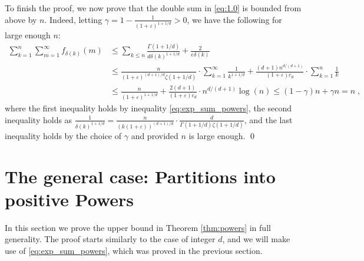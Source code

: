 \documentclass[11pt]{article}
\theoremstyle{plain}
\begin{document}
To finish the proof, we now prove that the double sum in \eqref{eq:1.0} is bounded from above by $n$. Indeed, letting $\gamma=1-\frac{1}{(1+\varepsilon)^{1+1/d}}>0$, we have the following for large enough $n$:
\begin{align*}
    \sum _{k=1}^{n} \sum_{m=1}^{\infty} f_{\delta(k)}(m) &\leq \sum _{k\leq n} \frac{\Gamma\left(1+{1}/{d}\right)}{d\delta(k)^{1+1/d}}+\frac{2}{e\delta(k)}\\
    &\leq \frac{n}{(1+\varepsilon)^{(d+1)/d}{\zeta\left(1+{1}/{d}\right)}}\cdot \sum_{k=1}^{\infty}\frac{1}{k^{1+1/d}}+\frac{(d+1)n^{d/(d+1)}}{(1+\varepsilon)c_d}\cdot \sum_{k=1}^{n}\frac{1}{k}\\
     &\leq \frac{n}{(1+\varepsilon)^{1+1/d}} +\frac{2(d+1)}{(1+\varepsilon) c_d}\cdot n^{d/(d+1)}\log(n)\leq (1-\gamma)n+\gamma n=n\;,
\end{align*}
where the first inequality holds by inequality \eqref{eq:exp_sum_powers}, the second inequality holds as $\frac{1}{\delta(k)^{1+1/d}}=\frac{n}{(k(1+\varepsilon))^{(d+1)/d}}\cdot \frac{d}{\Gamma\left(1+{1}/{d}\right)\zeta\left(1+{1}/{d}\right)}$, and the last inequality holds by the choice of $\gamma$ and provided $n$ is large enough. \qed














\section{The general case: Partitions into positive Powers}\label{sec:proofpowers2}
In this section we prove the upper bound in Theorem \ref{thm:powers} in full generality.
The proof starts similarly to the case of integer $d$, and we will make use of \eqref{eq:exp_sum_powers}, which was proved in the previous section.
\end{document}
